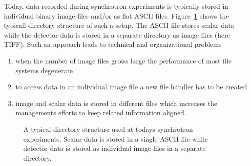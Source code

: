 
Today, data recorded during synchrotron experiments is typically stored in
individual binary image files and/or as flat ASCII files. 
Figure~\ref{fig:nxintro:old_fstree} shows the typicall directory structure of
such a setup. The ASCII file stores scalar data while the detector data is
stored in a separate directory as image files (here TIFF).
Such an approach leads to technical and organizational problems
\begin{enumerate}
\item when the number of image files grows large the performance of most file
systems degenerate 
\item to access data in an individual image file a new file handler has to be
created 
\item image and scalar data is stored in different files which increases the
managements efforts to keep related information aligned.
\end{enumerate}
\begin{figure}[tb]
    \centering
    \begin{minipage}[c]{0.4\linewidth}
    \centering
    \end{minipage}
    \hspace{0.05\linewidth}
    \begin{minipage}[c]{0.5\linewidth}
    \caption{{\small A typical directory structure used at todays synchrotron
    experiments. Scalar data is stored in a single ASCII file while detector
    data is stored as individual image files in a separate directory.}}
    \label{fig:nxintro:old_fstree}
    \end{minipage}
\end{figure}

